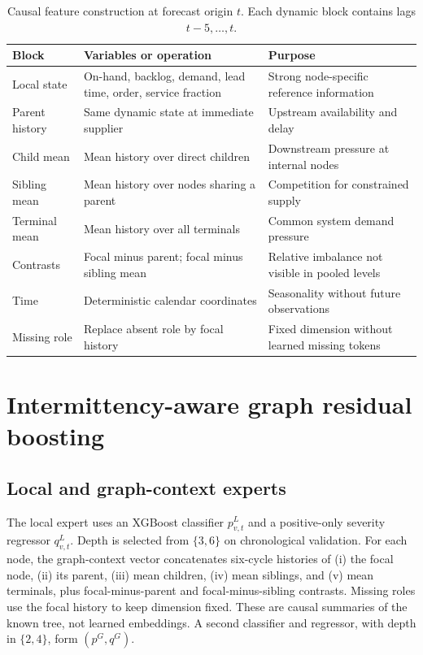 \documentclass[11pt,a4paper]{article}
\begin{document}
\begin{table}[tb]\centering\small
\caption{Causal feature construction at forecast origin $t$. Each dynamic block contains lags $t-5,\ldots,t$.}\label{tab:features}
\begin{tabularx}{\linewidth}{p{.22\linewidth}p{.31\linewidth}Y}\toprule
Block & Variables or operation & Purpose \\\midrule
Local state & On-hand, backlog, demand, lead time, order, service fraction & Strong node-specific reference information \\
Parent history & Same dynamic state at immediate supplier & Upstream availability and delay \\
Child mean & Mean history over direct children & Downstream pressure at internal nodes \\
Sibling mean & Mean history over nodes sharing a parent & Competition for constrained supply \\
Terminal mean & Mean history over all terminals & Common system demand pressure \\
Contrasts & Focal minus parent; focal minus sibling mean & Relative imbalance not visible in pooled levels \\
Time & Deterministic calendar coordinates & Seasonality without future observations \\
Missing role & Replace absent role by focal history & Fixed dimension without learned missing tokens \\
\bottomrule\end{tabularx}
\end{table}

\section{Intermittency-aware graph residual boosting}
\subsection{Local and graph-context experts}
The local expert uses an XGBoost classifier $p^L_{v,t}$ and a positive-only severity regressor $q^L_{v,t}$. Depth is selected from $\{3,6\}$ on chronological validation. For each node, the graph-context vector concatenates six-cycle histories of (i) the focal node, (ii) its parent, (iii) mean children, (iv) mean siblings, and (v) mean terminals, plus focal-minus-parent and focal-minus-sibling contrasts. Missing roles use the focal history to keep dimension fixed. These are causal summaries of the known tree, not learned embeddings. A second classifier and regressor, with depth in $\{2,4\}$, form $(p^G,q^G)$.
\end{document}
